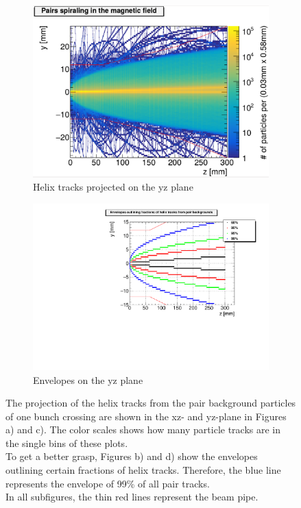 \begin{figure}
\begin{subfigure}[b]{0.49\textwidth}
    \centering
        \includegraphics[height=0.26\textheight]{figures/Helix_tracks_yz_1bunch_lowres.pdf}
        \caption{Helix tracks projected on the yz plane}
	\label{fig:helix_yz}
    \end{subfigure}
    \begin{subfigure}[b]{0.49\textwidth}
    \centering
        \includegraphics[height=0.26\textheight]{figures/HelixEnvelopes_yz.pdf}
        \caption{Envelopes on the yz plane}
        \label{fig:envelopes_yz}
    \end{subfigure}
    \caption[Helix tracks and their envelopes]{
    The projection of the helix tracks from the pair background particles of one bunch crossing are shown in the xz- and yz-plane in Figures a) and c).
    The color scales shows how many particle tracks are in the single bins of these plots.\\
    To get a better grasp, Figures b) and d) show the envelopes outlining certain fractions of helix tracks.
    Therefore, the blue line represents the envelope of 99\% of all pair tracks.\\
    In all subfigures, the thin red lines represent the beam pipe.
    }
    \label{fig:Helixes}
\end{figure}

